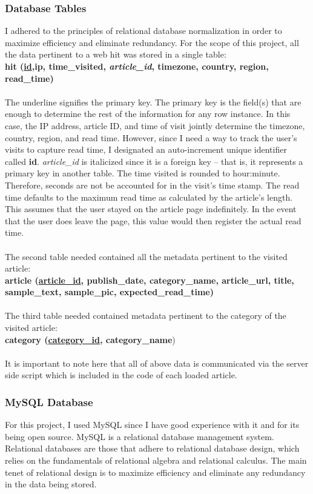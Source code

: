 \documentclass[12pt]{article}
\begin{document}
\subsubsection{Database Tables}
I adhered to the principles of relational database normalization in order to maximize efficiency and eliminate redundancy. For the scope of this project, all the data pertinent to a web hit was stored in a single table: \\ 
{\large\textbf{hit (\underline{id},ip, time\_visited, \textit{article\_id}, timezone, country, region, read\_time)}} \\ \\
The underline signifies the primary key. The primary key is the field(s) that are enough to determine the rest of the information for any row instance. In this case, the IP address, article ID, and time of visit jointly determine the timezone, country, region, and read time. However, since I need a way to track the user's visits to capture read time, I designated an auto-increment unique identifier called \textbf{id}. \textit{article\_id} is italicized since it is a foreign key -- that is, it represents a primary key in another table. The time visited is rounded to hour:minute. Therefore, seconds are not be accounted for in the visit's time stamp. The read time defaults to the maximum read time as calculated by the article's length. This assumes that the user stayed on the article page indefinitely. In the event that the user does leave the page, this value would then register the actual read time.
\\ \\
The second table needed contained all the metadata pertinent to the visited article:\\
{\large\textbf{article (\underline{article\_id}, publish\_date, category\_name, article\_url, title, sample\_text, sample\_pic, expected\_read\_time)}} \\ \\

The third table needed contained metadata pertinent to the category of the visited article:\\
{\large\textbf{category (\underline{category\_id}, category\_name})}
\\ \\

It is important to note here that all of above data is communicated via the server side script which is included in the code of each loaded article. 

\subsubsection{MySQL Database}
For this project, I used MySQL since I have good experience with it and for its being open source. MySQL is a relational database management system. Relational databases are those that adhere to relational database design, which relies on the fundamentals of relational algebra and relational calculus. The main tenet of relational design is to maximize efficiency and eliminate any redundancy in the data being stored.
\end{document}
